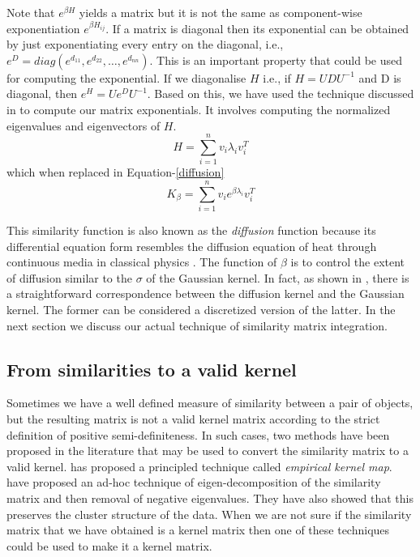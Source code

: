 Note that $e^{\beta H}$ yields a matrix but it is not the same as component-wise exponentiation $e^{\beta H_{ij}}$. If a matrix is diagonal then its exponential can be obtained by just exponentiating every entry on the diagonal, i.e., $e^{D}=diag(e^{d_{11}},e^{d_{22}},\dots,e^{d_{nn}})$. This is an important property that could be used for computing the exponential. If we diagonalise $H$ i.e., if $H = UDU^{-1}$ and D is diagonal, then $e^{H} = Ue^{D}U^{-1}$. Based on this, we have used the technique discussed in \citet{Moler2003Nineteen} to compute our matrix exponentials. It involves computing the normalized eigenvalues and eigenvectors of $H$.
\begin{equation}
    H = \sum_{i=1}^{n}v_{i}\lambda_{i}v_{i}^{T}
\end{equation}
which when replaced in Equation-\ref{diffusion}
\begin{equation}
   K_{\beta}=\sum_{i=1}^{n}v_{i}e^{\beta \lambda_{i}}v_{i}^{T}
\end{equation}

This similarity function is also known as the \textit{diffusion} function because its differential equation form 
resembles the diffusion equation of heat through continuous media in classical physics \citep{Kondor02diffusion}. 
The function of $\beta$ is to control the extent of diffusion similar to the $\sigma$ of the Gaussian kernel. 
In fact, as shown in \citet{kernel_methodsvert2004}, there is a straightforward correspondence between the diffusion kernel and 
the Gaussian kernel. The former can be considered a discretized version of the latter. In the next section we discuss our actual technique of similarity matrix integration. 

\subsection{From similarities to a valid kernel}
Sometimes we have a well defined measure of similarity between a pair of objects, but the resulting matrix is 
not a valid kernel matrix according to the strict definition of positive semi-definiteness. In such cases, 
two methods have been proposed in the literature that may be used to convert the similarity matrix to a 
valid kernel. \citet{tsuda99supportasymmetric} has proposed a principled technique called \textit{empirical kernel map}. \citet{roth2002going} have proposed an ad-hoc technique of eigen-decomposition of the similarity matrix and then removal of negative eigenvalues. They have also showed that this preserves the cluster structure of the data. When we are not sure if the similarity matrix that we have obtained is a kernel matrix then one of these techniques could be used to make it a kernel matrix. 
